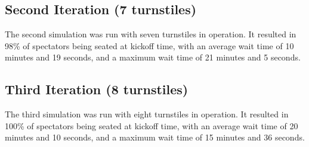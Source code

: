 \documentclass[11pt]{article}
\begin{document}
    \subsection{Second Iteration (7 turnstiles)}
    The second simulation was run with seven turnstiles in operation.
    It resulted in 98\% of spectators being seated at kickoff time, with an average wait time of 10 minutes and 19
    seconds, and a maximum wait time of 21 minutes and 5 seconds.

    \subsection{Third Iteration (8 turnstiles)}
    The third simulation was run with eight turnstiles in operation.
    It resulted in 100\% of spectators being seated at kickoff time, with an average wait time of 20 minutes and 10
    seconds, and a maximum wait time of 15 minutes and 36 seconds.
\end{document}
